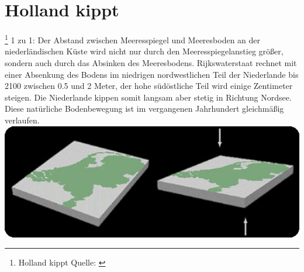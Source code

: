 \section{Holland kippt} \footnote{Holland kippt Quelle: \cite{meeresspiegel2}}
1 zu 1:\newline
Der Abstand zwischen Meeresspiegel und Meeresboden an der niederländischen Küste wird nicht 
nur durch den Meeresspiegelanstieg größer, sondern auch durch das Absinken des Meeresbodens. 
Rijkswaterstaat rechnet mit einer Absenkung des Bodens im niedrigen nordwestlichen Teil der Niederlande 
bis 2100 zwischen 0.5 und 2 Meter, der hohe südöstliche Teil wird einige Zentimeter steigen. 
Die Niederlande kippen somit langsam aber stetig in Richtung Nordsee. Diese natürliche Bodenbewegung 
ist im vergangenen Jahrhundert gleichmäßig verlaufen.
\newline
\includegraphics[width=1\textwidth]{images/niederlande_kippen.png}
\cite{kippen_bild}   
